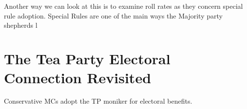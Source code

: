 \documentclass[12pt]{article}
\begin{document}
Another way we can look at this is to examine roll rates as they concern special rule adoption. Special Rules are one of the main ways the Majority party shepherds l

\section{The Tea Party Electoral Connection Revisited}
Conservative MCs adopt the TP moniker for electoral benefits.

\newpage
    {}


\end{document}
